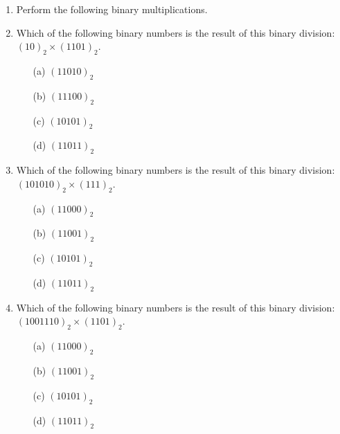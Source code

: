 \documentclass[]{report}
\begin{document}
\begin{enumerate}
\item Perform the following binary multiplications.


\item Which of the following binary numbers is the result of this binary division: $(10)_{2} \times ( 1101)_{2}$. %
\begin{multicols}{2}
\begin{itemize}
\item[(a)] $(11010)_{2}$ %
\item[(b)] $(11100)_{2}$ %
\item[(c)] $(10101)_{2}$ %
\item[(d)] $(11011)_2$ %
\end{itemize}
\end{multicols}
\item Which of the following binary numbers is the result of this binary division: $(101010)_{2} \times( 111 )_{2}$. %
\begin{multicols}{2}
\begin{itemize}
\item[(a)] $(11000)_{2}$ %
\item[(b)] $(11001)_{2}$ %
\item[(c)] $(10101)_{2}$ %
\item[(d)] $(11011)_2$ %
\end{itemize}
\end{multicols}
\item Which of the following binary numbers is the result of this binary division: $(1001110)_{2}\times ( 1101 )_{2}$. %
\begin{multicols}{2}
\begin{itemize}
\item[(a)] $(11000)_{2}$ %
\item[(b)] $(11001)_{2}$ %
\item[(c)] $(10101)_{2}$ %
\item[(d)] $(11011)_2$ %
\end{itemize}
\end{multicols}


\end{enumerate}
\end{document}
